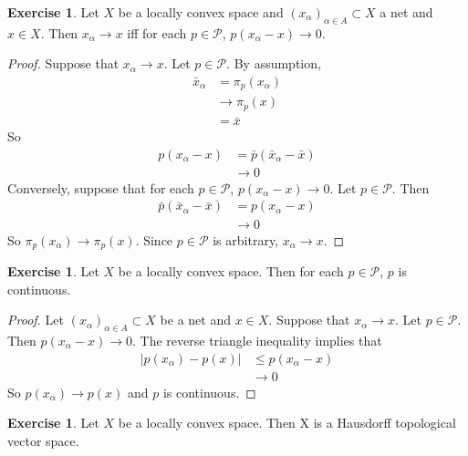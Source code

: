 \documentclass[12pt]{amsart}
\theoremstyle{definition}
\newtheorem{ex}[definition]{Exercise}
\newcommand{\al}{\alpha}
\newcommand{\MP}{\mathcal{P}}
\DeclareMathOperator*{\0}{\mbf{0}}
\DeclareMathOperator*{\1}{\mbf{1}}
\begin{document}
	\begin{ex}
		Let $X$ be a locally convex space and $(x_{\al})_{\al \in A} \subset X$ a net and $x \in X$. Then $x_{\al} \rightarrow x$ iff for each $p \in \MP$, $p(x_{\al} - x) \rightarrow 0$.
	\end{ex}
	
	\begin{proof}
		Suppose that $x_{\al} \rightarrow x$. Let $p \in \MP$. 
		By assumption,  
		\begin{align*}
			\bar{x}_{\al} 
			&= \pi_p(x_{\al}) \\
			&\rightarrow \pi_p(x) \\
			&= \bar{x}
		\end{align*}   
		So 
		\begin{align*}
			p(x_{\al} - x) 
			&= \bar{p}(\bar{x}_{\al} - \bar{x}) \\
			& \rightarrow 0
		\end{align*}
		Conversely, suppose that for each $p \in \MP$, $p(x_{\al} - x) \rightarrow 0$. Let $p \in \MP$. Then 
		\begin{align*}
			\bar{p}(\bar{x}_{\al} - \bar{x}) 
			&= p(x_{\al} - x) \\
			& \rightarrow 0
		\end{align*} 
		So $\pi_p(x_{\al}) \rightarrow \pi_p(x)$. Since $p \in \MP$ is arbitrary, $x_{\al} \rightarrow x$. 
	\end{proof}
	
	\begin{ex}
		Let $X$ be a locally convex space. Then for each $p \in \MP$, $p$ is continuous. 
	\end{ex}
	
	\begin{proof}
		Let $(x_{\al})_{\al \in A} \subset X$ be a net and $x \in X$. Suppose that $x_{\al} \rightarrow x$. Let $p \in \MP$. Then $p(x_{\al} - x) \rightarrow 0$. The reverse triangle inequality implies that 
		\begin{align*}
			|p(x_{\al}) - p(x)| 
			& \leq p(x_{\al} - x) \\
			& \rightarrow 0
		\end{align*}
		So $p(x_{\al}) \rightarrow p(x)$ and $p$ is continuous. 
	\end{proof}
	
	\begin{ex}
		Let $X$ be a locally convex space. Then X is a Hausdorff topological vector space.
	\end{ex}
	
\end{document}
